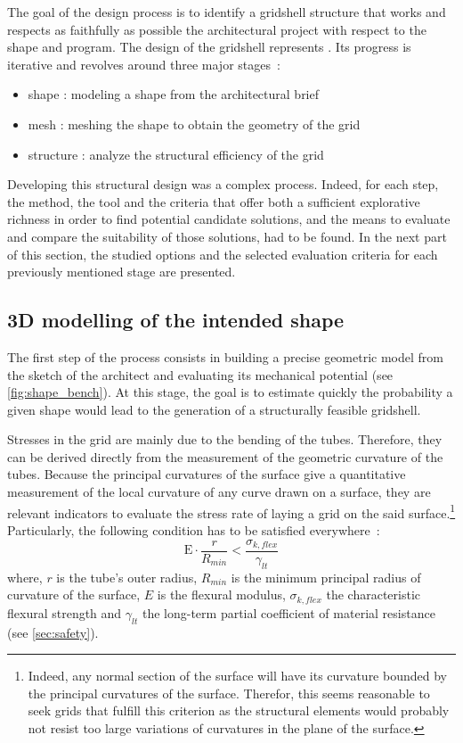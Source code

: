 The goal of the design process is to identify a gridshell structure that works and respects as faithfully as possible the architectural project with respect to the shape and program. The design of the gridshell represents . Its progress is iterative and revolves around three major stages~: 
\begin{itemize}
\item shape : modeling a shape from the architectural brief
\item mesh : meshing the shape to obtain the geometry of the grid
\item structure : analyze the structural efficiency of the grid
\end{itemize}
Developing this structural design was a complex process. Indeed, for each step, the method, the tool and the criteria that offer both a sufficient explorative richness in order to find potential candidate solutions, and the means to evaluate and compare the suitability of those solutions, had to be found. In the next part of this section, the studied options and the selected evaluation criteria for each previously mentioned stage are presented.

\subsection{3D modelling of the intended shape}
The first step of the process consists in building a precise geometric model from the sketch of the architect and evaluating its mechanical potential (see \cref{fig:shape_bench}). At this stage, the goal is to estimate quickly the probability a given shape would lead to the generation of a structurally feasible gridshell.

Stresses in the grid are mainly due to the bending of the tubes. Therefore, they can be derived directly from the measurement of the geometric curvature of the tubes. Because the principal curvatures of the surface give a quantitative measurement of the local curvature of any curve drawn on a surface, they are relevant indicators to evaluate the stress rate of laying a grid on the said surface.\footnote{Indeed, any normal section of the surface will have its curvature bounded by the principal curvatures of the surface. Therefor, this seems reasonable to seek grids that fulfill this criterion as the structural elements would probably not resist too large variations of curvatures in the plane of the surface.} Particularly, the following condition has to be satisfied everywhere~: 
\begin{equation}
	\mathrm{E} \cdot \frac{r}{R_{min}} < \frac{\sigma_{k,flex}}{\gamma_{lt}} 
	\label{eq:crit_1}
\end{equation}
where, $r$ is the tube’s outer radius, $R_{min}$ is the minimum principal radius of curvature of the surface, $E$ is the flexural modulus, $\sigma_{k,flex}$ the characteristic flexural strength and $\gamma_{lt}$ the long-term partial coefficient of material resistance (see \cref{sec:safety}). 

